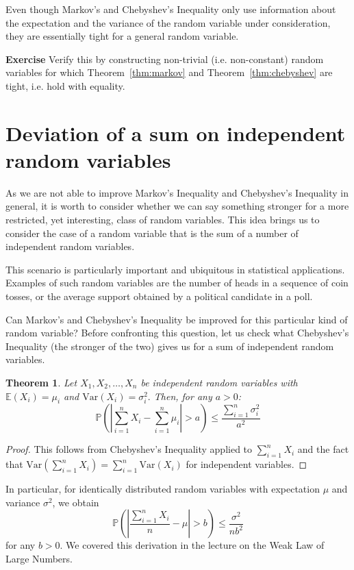 \documentclass[10pt]{article}
\newtheorem{theorem}{Theorem}
\newcommand{\E}{\mathbb{E}}
\renewcommand{\Pr}{\mathbb{P}}
\begin{document}
Even though Markov's and Chebyshev's Inequality only use information
about the expectation and the variance of the random variable under
consideration, they are essentially tight for a general random
variable. 

{\bf Exercise} Verify this by constructing non-trivial
(i.e. non-constant) random variables for which
Theorem~\ref{thm:markov} and Theorem~\ref{thm:chebyshev} are tight,
i.e. hold with equality.




\section{Deviation of a sum on independent random variables}

As we are not able to improve Markov's Inequality and Chebyshev's
Inequality in general, it is worth to consider whether we can say
something stronger for a more restricted, yet interesting, class of
random variables. This idea brings us to consider the case of a random variable
that is the sum of a number of independent random variables.

This scenario is particularly important and ubiquitous in statistical applications. 
Examples of such random variables are the number of heads in a sequence of coin tosses, or the average
support obtained by a political candidate in a poll. 

Can Markov's and Chebyshev's Inequality be improved for this particular kind of random variable?
Before confronting this question, let us check what Chebyshev's
Inequality (the stronger of the two)
gives us for a sum of independent random variables.

\begin{theorem} \label{thm:wl}
Let $X_1, X_2, \ldots, X_n$ be independent random variables with
$\E(X_i) = \mu_i$ and 
$\mathrm{Var}(X_i) = \sigma_i^2.$  Then, for any $ a>0$:
$$
\Pr(|\sum_{i=1}^n X_i - \sum_{i=1}^n  \mu_i| > a) \leq \frac{\sum_{i=1}^n \sigma_i^2}{a^2}
$$
\end{theorem}
\begin{proof}
This follows from Chebyshev's Inequality applied to $\sum_{i=1}^n X_i$
and the fact that $\mathrm{Var}(\sum_{i=1}^n X_i) = \sum_{i=1}^n
\mathrm{Var}(X_i)$ for independent variables.
\end{proof}

In particular, for identically distributed random variables with expectation
$\mu$ and
variance $\sigma^2$, we obtain
$$
\Pr\left(\left|\frac{\sum_{i=1}^n X_i}{n} -  \mu\right| > b\right) \leq \frac{\sigma^2}{n b^2}
$$ for any $b>0$. 
We covered this derivation in the lecture on the Weak Law of Large
Numbers. 
\end{document}
